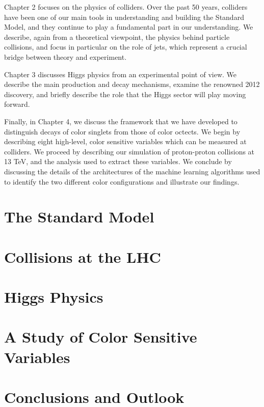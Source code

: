 \documentclass[10pt,a4paper]{book}
\begin{document}
Chapter 2 focuses on the physics of colliders. Over the past 50 years, colliders have been one of our main tools in understanding and building the Standard Model, and they continue to play a fundamental part in our understanding. We describe, again from a theoretical viewpoint, the physics behind particle collisions, and focus in particular on the role of jets, which represent a crucial bridge between theory and experiment.

Chapter 3 discusses Higgs physics from an experimental point of view. We describe the main production and decay mechanisms, examine the renowned 2012 discovery, and briefly describe the role that the Higgs sector will play moving forward.

Finally, in Chapter 4, we discuss the framework that we have developed to distinguish decays of color singlets from those of color octects. We begin by describing eight high-level, color sensitive variables which can be measured at colliders. We proceed by describing our simulation of proton-proton collisions at 13 TeV, and the analysis used to extract these variables. We conclude by discussing the details of the architectures of the machine learning algorithms used to identify the two different color configurations and illustrate our findings.

\chapter{The Standard Model}


\chapter{Collisions at the LHC}


\chapter{Higgs Physics}


\chapter{A Study of Color Sensitive Variables}


\chapter*{Conclusions and Outlook}
\end{document}
